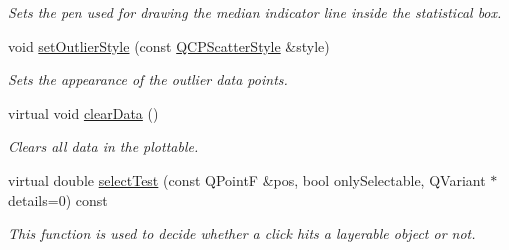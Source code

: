 \begin{DoxyCompactItemize}
\begin{DoxyCompactList}\small\item\em Sets the pen used for drawing the median indicator line inside the statistical box. \end{DoxyCompactList}\item 
void \hyperlink{classQCPStatisticalBox_ad5241943422eb8e58360a97e99ad6aa7}{set\+Outlier\+Style} (const \hyperlink{classQCPScatterStyle}{Q\+C\+P\+Scatter\+Style} \&style)
\begin{DoxyCompactList}\small\item\em Sets the appearance of the outlier data points. \end{DoxyCompactList}\item 
\hypertarget{classQCPStatisticalBox_a19112994449df0c20287858436cc68e3}{}virtual void \hyperlink{classQCPStatisticalBox_a19112994449df0c20287858436cc68e3}{clear\+Data} ()\label{classQCPStatisticalBox_a19112994449df0c20287858436cc68e3}

\begin{DoxyCompactList}\small\item\em Clears all data in the plottable. \end{DoxyCompactList}\item 
virtual double \hyperlink{classQCPStatisticalBox_a7d3ac843dc48a085740fdfc4319a89cc}{select\+Test} (const Q\+Point\+F \&pos, bool only\+Selectable, Q\+Variant $\ast$details=0) const 
\begin{DoxyCompactList}\small\item\em This function is used to decide whether a click hits a layerable object or not. \end{DoxyCompactList}\end{DoxyCompactItemize}

